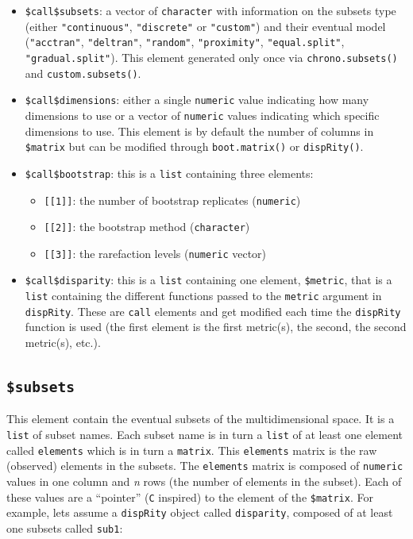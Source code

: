 \documentclass[]{book}
\providecommand{\tightlist}{%
  \setlength{\itemsep}{0pt}\setlength{\parskip}{0pt}}
\theoremstyle{definition}
\theoremstyle{definition}
\theoremstyle{remark}
\begin{document}
\begin{itemize}
\tightlist
\item
  \texttt{\$call\$subsets}: a vector of \texttt{character} with
  information on the subsets type (either \texttt{"continuous"},
  \texttt{"discrete"} or \texttt{"custom"}) and their eventual model
  (\texttt{"acctran"}, \texttt{"deltran"}, \texttt{"random"},
  \texttt{"proximity"}, \texttt{"equal.split"},
  \texttt{"gradual.split"}). This element generated only once via
  \texttt{chrono.subsets()} and \texttt{custom.subsets()}.
\item
  \texttt{\$call\$dimensions}: either a single \texttt{numeric} value
  indicating how many dimensions to use or a vector of \texttt{numeric}
  values indicating which specific dimensions to use. This element is by
  default the number of columns in \texttt{\$matrix} but can be modified
  through \texttt{boot.matrix()} or \texttt{dispRity()}.
\item
  \texttt{\$call\$bootstrap}: this is a \texttt{list} containing three
  elements:

  \begin{itemize}
  \tightlist
  \item
    \texttt{{[}{[}1{]}{]}}: the number of bootstrap replicates
    (\texttt{numeric})
  \item
    \texttt{{[}{[}2{]}{]}}: the bootstrap method (\texttt{character})
  \item
    \texttt{{[}{[}3{]}{]}}: the rarefaction levels (\texttt{numeric}
    vector)
  \end{itemize}
\item
  \texttt{\$call\$disparity}: this is a \texttt{list} containing one
  element, \texttt{\$metric}, that is a \texttt{list} containing the
  different functions passed to the \texttt{metric} argument in
  \texttt{dispRity}. These are \texttt{call} elements and get modified
  each time the \texttt{dispRity} function is used (the first element is
  the first metric(s), the second, the second metric(s), etc.).
\end{itemize}

\subsection{\texorpdfstring{\texttt{\$subsets}}{\$subsets}}\label{subsets}

This element contain the eventual subsets of the multidimensional space.
It is a \texttt{list} of subset names. Each subset name is in turn a
\texttt{list} of at least one element called \texttt{elements} which is
in turn a \texttt{matrix}. This \texttt{elements} matrix is the raw
(observed) elements in the subsets. The \texttt{elements} matrix is
composed of \texttt{numeric} values in one column and \emph{n} rows (the
number of elements in the subset). Each of these values are a
``pointer'' (\texttt{C} inspired) to the element of the
\texttt{\$matrix}. For example, lets assume a \texttt{dispRity} object
called \texttt{disparity}, composed of at least one subsets called
\texttt{sub1}:
\end{document}
